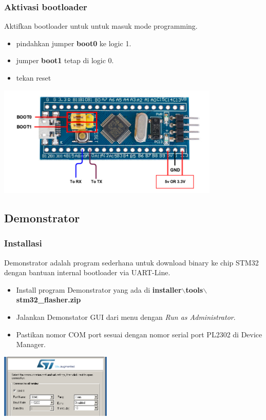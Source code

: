 \documentclass[table,dvipsnames]{beamer}
\begin{document}
	\begin{frame}
		\frametitle{Aktivasi bootloader}
		\begin{exampleblock}{}
			Aktifkan bootloader untuk untuk masuk mode programming.
			\begin{itemize}
				\item pindahkan jumper \textbf{boot0} ke logic 1.
				\item jumper \textbf{boot1} tetap di logic 0.
				\item tekan reset
			\end{itemize}
		\end{exampleblock}

		\begin{center}
			\includegraphics[width=300pt]{images/flashing}
		\end{center}
	\end{frame}

	\subsection{Demonstrator}
	\begin{frame}
		\frametitle{Installasi}
		\begin{exampleblock}{}
			Demonstrator adalah program sederhana untuk download binary ke chip STM32 dengan bantuan internal bootloader via UART-Line.
			\begin{itemize}
				\item Install program Demonstrator yang ada di \textbf{installer$\backslash$tools$\backslash$stm32\_flasher.zip}
				\item Jalankan Demonstator GUI dari menu dengan \textit{Run as Administrator}.
				\item Pastikan nomor COM port sesuai dengan nomor serial port PL2302 di Device Manager.
			\end{itemize}
		\end{exampleblock}

		\begin{center}
			\includegraphics[width=150pt]{images/demons}
		\end{center}
	\end{frame}
\end{document}
